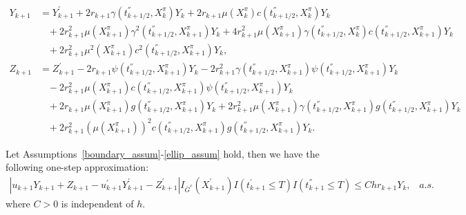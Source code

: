 \documentclass[10pt,a4paper]{amsart}
\begin{document}
\begin{align} 
Y_{k+1} &= Y_{k+1}^{'}  + 2r_{k+1}\gamma(t_{k+1/2}^{''}, X^{\pi}_{k})Y_{k} + 2r_{k+1}\mu(X_{k}^{\pi})c(t_{k+1/2}^{''}, X_{k}^{\pi})Y_{k}  
\nonumber  \\& \;\;\; 
+ 2r_{k+1}^{2}\mu(X_{k+1}^{\pi})\gamma^{2}(t_{k+1/2}^{''},X_{k+1}^{\pi})Y_{k} + 4r_{k+1}^{2}\mu(X_{k+1}^{\pi})\gamma(t_{k+1/2}^{''},X_{k}^{\pi}) c(t_{k+1/2}^{''},X_{k+1}^{\pi})Y_{k}  
\nonumber \\   &  \;\;\;   + 2r_{k+1}^{2}\mu^{2}(X_{k+1}^{\pi})c^{2}(t_{k+1/2}^{''},X_{k+1}^{\pi})Y_{k}  ,\label{sym_y} \\
Z_{k+1} &= Z_{k+1}^{'} -   2r_{k+1}\psi(t_{k+1/2}^{''}, X^{\pi}_{k+1})Y_{k} - 2 r_{k+1}^{2}\gamma(t_{k+1/2}^{''}, X^{\pi}_{k+1}) \psi(t_{k+1/2}^{''}, X^{\pi}_{k+1})Y_{k}
\nonumber \\& \;\;\;- 2r_{k+1}^{2}\mu( X^{\pi}_{k+1})c(t_{k+1/2}^{''}, X_{k+1}^{\pi}) \psi(t_{k+1/2}^{''}, X_{k+1}^{\pi})Y_k
\nonumber \\& \;\;\; + 2r_{k+1}\mu( X^{\pi}_{k+1})g(t_{k+1/2}^{''}, X^{\pi}_{k+1})Y_{k} 
+ 2r_{k+1}^2\mu(X^{\pi}_{k+1})\gamma(t_{k+1/2}^{''}, X^{\pi}_{k+1})g(t_{k+1/2}^{''}, X^{\pi}_{k+1})Y_k  \nonumber  \\& \;\;\;  +  2r_{k+1}^{2}(\mu( X^{\pi}_{k+1}))^{2}c(t_{k+1/2}^{''}, X^{\pi}_{k+1})g(t_{k+1/2}^{''}, X^{\pi}_{k+1})Y_k.\label{sym_z}
\end{align}

\begin{lemma}\label{sticky_lemma_4.3}
Let Assumptions~\ref{boundary_assum}-\ref{ellip_assum} hold, then we have the following one-step approximation:
\begin{align*}
|u_{k+1}Y_{k+1} + Z_{k+1} - u_{k+1}^{'}Y_{k+1}^{'} - Z_{k+1}^{'}   |I_{\bar{G}^{c}}(X_{k+1}^{'})I(t^{'}_{k+1} \leq T)I(t^{''}_{k+1} \leq T) \leq Chr_{k+1}Y_{k},\;\; \;a.s.
\end{align*}
where $C > 0$ is independent of $h$.
\end{lemma}
\end{document}
